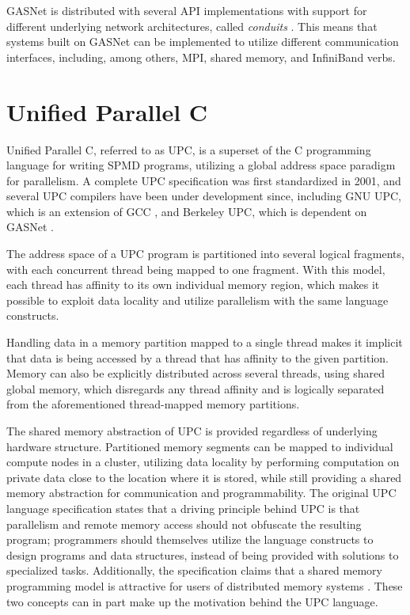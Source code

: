 \documentclass{uit-report}
\begin{document}
GASNet is distributed with several API implementations with support for different underlying network architectures, called \emph{conduits} \cite{gasnetreadme}. This means that systems built on GASNet can be implemented to utilize different communication interfaces, including, among others, MPI, shared memory, and InfiniBand verbs.

\section{Unified Parallel C}
Unified Parallel C, referred to as UPC, is a superset of the C programming language for writing SPMD programs, utilizing a global address space paradigm for parallelism. A complete UPC specification was first standardized in 2001, and several UPC compilers have been under development since, including GNU UPC, which is an extension of GCC \cite{web_gnu_upc}, and Berkeley UPC, which is dependent on GASNet \cite{web_berkeley_upc}.

The address space of a UPC program is partitioned into several logical fragments, with each concurrent thread being mapped to one fragment. With this model, each thread has affinity to its own individual memory region, which makes it possible to exploit data locality \cite{evaluation_of_upc} and utilize parallelism with the same language constructs.

Handling data in a memory partition mapped to a single thread makes it implicit that data is being accessed by a thread that has affinity to the given partition. Memory can also be explicitly distributed across several threads, using shared global memory, which disregards any thread affinity and is logically separated from the aforementioned thread-mapped memory partitions.

The shared memory abstraction of UPC is provided regardless of underlying hardware structure. Partitioned memory segments can be mapped to individual compute nodes in a cluster, utilizing data locality by performing computation on private data close to the location where it is stored, while still providing a shared memory abstraction for communication and programmability. The original UPC language specification states that a driving principle behind UPC is that parallelism and remote memory access should not obfuscate the resulting program; programmers should themselves utilize the language constructs to design programs and data structures, instead of being provided with solutions to specialized tasks. Additionally, the specification claims that a shared memory programming model is attractive for users of distributed memory systems \cite{upc_language_specification}. These two concepts can in part make up the motivation behind the UPC language.
\end{document}
